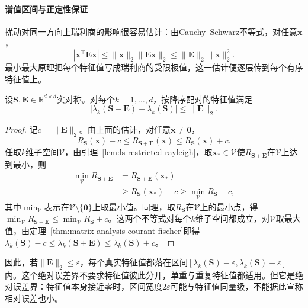 \paragraph{谱值区间与正定性保证}

扰动对同一方向上瑞利商的影响很容易估计：由Cauchy--Schwarz不等式，对任意$\bm x$，
\[
 |\bm x^\top\bm E\bm x|\leq\lVert\bm x\rVert_2\lVert\bm E\bm x\rVert_2\leq\lVert\bm E\rVert_2\lVert\bm x\rVert_2^2 .
\]
最小最大原理把每个特征值写成瑞利商的受限极值，这一估计便逐层传到每个有序特征值上。

\begin{theorem}[Weyl特征值扰动界]
\label{thm:ls-weyl-eigenvalue}
设$\bm S,\bm E\in\mathbb R^{d\times d}$实对称。对每个$k=1,\ldots,d$，按降序配对的特征值满足
\begin{equation}
 |\lambda_k(\bm S+\bm E)-\lambda_k(\bm S)|\leq\lVert\bm E\rVert_2 .
 \label{eq:matrix-analysis-weyl-eigenvalue-perturbation}
\end{equation}
\end{theorem}
\begin{proof}
记$c=\lVert\bm E\rVert_2$。由上面的估计，对任意$\bm x\neq\bm0$，
\[
 R_{\bm S}(\bm x)-c\leq R_{\bm S+\bm E}(\bm x)\leq R_{\bm S}(\bm x)+c .
\]
任取$k$维子空间$\mathcal V$，由引理~\ref{lem:ls-restricted-rayleigh}，取$\bm x_*\in\mathcal V$使$R_{\bm S+\bm E}$在$\mathcal V$上达到最小，则
\[
 \begin{aligned}
 \min_{\mathcal V}R_{\bm S+\bm E}
 &=R_{\bm S+\bm E}(\bm x_*)\\
 &\geq R_{\bm S}(\bm x_*)-c\geq\min_{\mathcal V}R_{\bm S}-c ,
 \end{aligned}
\]
其中$\min_{\mathcal V}$表示在$\mathcal V\setminus\{\bm0\}$上取最小值。同理，取$R_{\bm S}$在$\mathcal V$上的最小点，得$\min_{\mathcal V}R_{\bm S+\bm E}\leq\min_{\mathcal V}R_{\bm S}+c$。这两个不等式对每个$k$维子空间都成立，对$\mathcal V$取最大值，由定理~\ref{thm:matrix-analysis-courant-fischer}即得$\lambda_k(\bm S)-c\leq\lambda_k(\bm S+\bm E)\leq\lambda_k(\bm S)+c$。
\end{proof}
因此，若$\lVert\bm E\rVert_2\leq\varepsilon$，每个真实特征值都落在区间$[\lambda_k(\bm S)-\varepsilon,\lambda_k(\bm S)+\varepsilon]$内。这个绝对误差界不要求特征值彼此分开，单重与重复特征值都适用。但它是绝对误差界：特征值本身接近零时，区间宽度$2\varepsilon$可能与特征值同量级，不能据此宣称相对误差也小。

